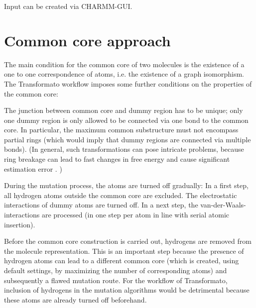 Input can be created via CHARMM-GUI\cite{Jo.2008}\cite{Braunsfeld.}.

\section{Common core approach}

The main condition for the common core of two molecules is the existence
of a one to one correspondence of atoms, i.e. the existence of a graph
isomorphism. The Transformato workflow imposes some further conditions
on the properties of the common core:

The junction between common core and dummy region has to be unique;
only one dummy region is only allowed to be connected via one bond to the
common core. In particular, the maximum common substructure must not
encompass partial rings (which would imply that dummy regions are
connected via multiple bonds). (In general, such transformations can pose intricate problems, because ring breakage can lead to fast changes in free energy
and cause significant estimation error \cite{Liu.2015}. )

During the mutation process, the atoms are turned off gradually: In
a first step, all hydrogen atoms outside the common core are excluded.
The electrostatic interactions of dummy atoms are turned off. In a
next step, the van-der-Waals-interactions are processed (in one step
per atom in line with serial atomic insertion). 

Before the common core construction is carried out, hydrogens are
removed from the molecule representation. This is an important step
because the presence of hydrogen atoms can lead to a different common
core (which is created, using default settings, by maximizing the
number of corresponding atoms) and subsequently a flawed mutation
route. For the workflow of Transformato, inclusion of hydrogens in
the mutation algorithms would be detrimental because these atoms are
already turned off beforehand.